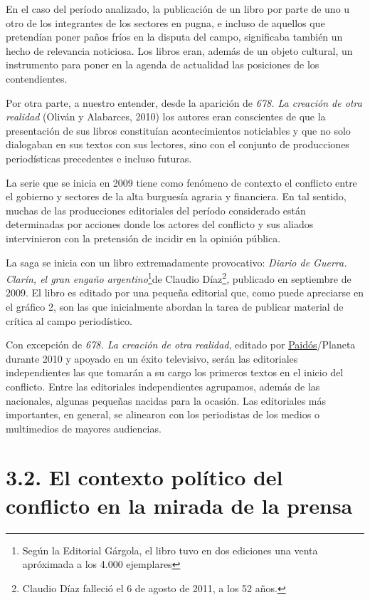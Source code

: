 {En el caso del período analizado, la publicación de un libro por parte de uno u otro de los integrantes de los sectores en pugna, e incluso de aquellos que pretendían poner paños fríos en la disputa del campo, significaba también un hecho de relevancia noticiosa. Los libros eran, además de un objeto cultural, un instrumento para poner en la agenda de actualidad las posiciones de los contendientes.

Por otra parte, a nuestro entender, desde la aparición de \emph{678. La creación de otra realidad} (Oliván y Alabarces, 2010) los autores eran conscientes de que la presentación de sus libros constituían acontecimientos noticiables y que no solo dialogaban en sus textos con sus lectores, sino con el conjunto de producciones periodísticas precedentes e incluso futuras.

La serie que se inicia en 2009 tiene como fenómeno de contexto el conflicto entre el gobierno y sectores de la alta burguesía agraria y financiera. En tal sentido, muchas de las producciones editoriales del período considerado están determinadas por acciones donde los actores del conflicto y sus aliados intervinieron con la pretensión de incidir en la opinión pública.

La saga se inicia con un libro extremadamente provocativo: \emph{Diario de Guerra. Clarín, el gran engaño argentino}\footnote{Según la Editorial Gárgola, el libro tuvo en dos ediciones una venta apróximada a los 4.000 ejemplares}de Claudio Díaz\footnote{Claudio Díaz falleció el 6 de agosto de 2011, a los 52 años.}, publicado en septiembre de 2009. El libro es editado por una pequeña editorial que, como puede apreciarse en el gráfico 2, son las que inicialmente abordan la tarea de publicar material de crítica al campo periodístico.

Con excepción de \emph{678. La creación de otra realidad}, editado por \href{http://www.lecturalia.com/editoriales/79/paidos}{Paidós}/Planeta durante 2010 y apoyado en un éxito televisivo, serán las editoriales independientes las que tomarán a su cargo los primeros textos en el inicio del conflicto. Entre las editoriales independientes agrupamos, además de las nacionales, algunas pequeñas nacidas para la ocasión. Las editoriales más importantes, en general, se alinearon con los periodistas de los medios o multimedios de mayores audiencias.

\section{3.2. El contexto político del conflicto en la mirada de la prensa}

}
